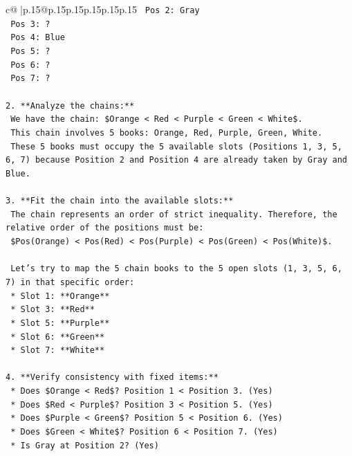 \documentclass{article}
\begin{document}
{\begin{supertabular}{c@{$\;$}|p{.15\linewidth}@{}p{.15\linewidth}p{.15\linewidth}p{.15\linewidth}p{.15\linewidth}p{.15\linewidth}}
{{{\texttt{    Pos 2: Gray} \\
\texttt{    Pos 3: ?} \\
\texttt{    Pos 4: Blue} \\
\texttt{    Pos 5: ?} \\
\texttt{    Pos 6: ?} \\
\texttt{    Pos 7: ?} \\
\\ 
\texttt{2.  **Analyze the chains:**} \\
\texttt{    We have the chain: \$Orange < Red < Purple < Green < White\$.} \\
\texttt{    This chain involves 5 books: Orange, Red, Purple, Green, White.} \\
\texttt{    These 5 books must occupy the 5 available slots (Positions 1, 3, 5, 6, 7) because Position 2 and Position 4 are already taken by Gray and Blue.} \\
\\ 
\texttt{3.  **Fit the chain into the available slots:**} \\
\texttt{    The chain represents an order of strict inequality. Therefore, the relative order of the positions must be:} \\
\texttt{    \$Pos(Orange) < Pos(Red) < Pos(Purple) < Pos(Green) < Pos(White)\$.} \\
\\ 
\texttt{    Let's try to map the 5 chain books to the 5 open slots (1, 3, 5, 6, 7) in that specific order:} \\
\texttt{    *   Slot 1: **Orange**} \\
\texttt{    *   Slot 3: **Red**} \\
\texttt{    *   Slot 5: **Purple**} \\
\texttt{    *   Slot 6: **Green**} \\
\texttt{    *   Slot 7: **White**} \\
\\ 
\texttt{4.  **Verify consistency with fixed items:**} \\
\texttt{    *   Does \$Orange < Red\$? Position 1 < Position 3. (Yes)} \\
\texttt{    *   Does \$Red < Purple\$? Position 3 < Position 5. (Yes)} \\
\texttt{    *   Does \$Purple < Green\$? Position 5 < Position 6. (Yes)} \\
\texttt{    *   Does \$Green < White\$? Position 6 < Position 7. (Yes)} \\
\texttt{    *   Is Gray at Position 2? (Yes)} \\
}}}
\end{supertabular}}
\end{document}
